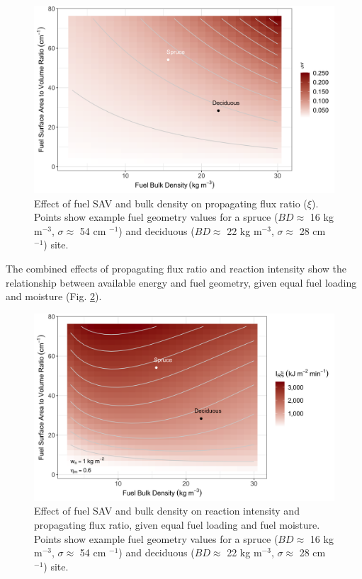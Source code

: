 \documentclass[a4paper, 12pt] {report}
\begin{document}
\begin{figure}
	\includegraphics[width=\linewidth]{figures/fluxrat.png}
	\caption{Effect of fuel SAV and bulk density on propagating flux ratio ($\xi$). Points show example fuel geometry values for a spruce ($BD \approx$ 16 kg m$^{-3}$, $\sigma \approx$ 54 cm $^{-1}$) and deciduous ($BD \approx$ 22 kg m$^{-3}$, $\sigma \approx$ 28 cm $^{-1}$) site.}
	\label{fig:fluxrat}
\end{figure}

The combined effects of propagating flux ratio and reaction intensity show the relationship between available energy and fuel geometry, given equal fuel loading and moisture (Fig. \ref{fig:reaction}).

\begin{figure}
	\includegraphics[width=\linewidth]{figures/reaction_intensity.png}
	\caption{Effect of fuel SAV and bulk density on reaction intensity and propagating flux ratio, given equal fuel loading and fuel moisture. Points show example fuel geometry values for a spruce ($BD \approx$ 16 kg m$^{-3}$, $\sigma \approx$ 54 cm $^{-1}$) and deciduous ($BD \approx$ 22 kg m$^{-3}$, $\sigma \approx$ 28 cm $^{-1}$) site.}
	\label{fig:reaction}
\end{figure}
\end{document}
